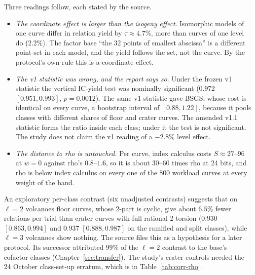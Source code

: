 Three readings follow, each stated by the source.
\begin{itemize}
\item \emph{The coordinate effect is larger than the isogeny effect.}
  Isomorphic models of one curve differ in relation yield by
  $\tau\approx4.7\%$, more than curves of one level do ($2.2\%$). The
  factor base ``the 32 points of smallest abscissa'' is a different point
  set in each model, and the yield follows the set, not the curve. By the
  protocol's own rule this is a coordinate effect.
\item \emph{The v1 statistic was wrong, and the report says so.} Under the
  frozen v1 statistic the vertical IC-yield test was nominally significant
  ($0.972$ $[0.951,0.993]$, $p=0.0012$). The same v1 statistic gave BSGS,
  whose cost is identical on every curve, a bootstrap interval of
  $[0.88,1.22]$, because it pools classes with different shares of floor
  and crater curves. The amended v1.1 statistic forms the ratio inside each
  class; under it the test is not significant. The study does not claim the
  v1 reading of a $-2.8\%$ level effect.
\item \emph{The distance to rho is untouched.} Per curve, index calculus
  costs $S\approx27$--$96$ at $w=0$ against rho's $0.8$--$1.6$, so it is
  about 30--60 times rho at 24 bits, and rho is below index calculus on
  every one of the 800 workload curves at every weight of the band.
\end{itemize}
An exploratory per-class contrast (six unadjusted contrasts) suggests that
on $\ell=2$ volcanoes floor curves, whose 2-part is cyclic, give about
$6.5\%$ fewer relations per trial than crater curves with full rational
2-torsion ($0.930$ $[0.863,0.994]$ and $0.937$ $[0.888,0.987]$ on the
ramified and split classes), while $\ell=3$ volcanoes show nothing. The
source files this as a hypothesis for a later protocol. Its successor
attributed $99\%$ of the $\ell=2$ contrast to the base's cofactor classes
(Chapter~\ref{sec:transfer}). The study's crater controls needed the
24 October class-set-up erratum, which is in Table~\ref{tab:corr-rho}.

